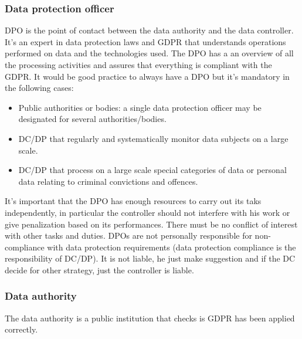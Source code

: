 \subsubsection{Data protection officer}
DPO is the point of contact between the data authority and the data controller. It's an expert in data protection laws and GDPR that understands operations performed on data and the technologies used. The DPO has a an overview of all the processing activities and assures that everything is compliant with the GDPR. It would be good practice to always have a DPO but it's mandatory in the following cases:
\begin{itemize}
    \item Public authorities or bodies: a single data protection officer may be designated for several authorities/bodies.
    \item  DC/DP that regularly and systematically monitor data subjects on a large scale.
    \item  DC/DP that process on a large scale special categories of data or personal data relating to criminal convictions and offences.
\end{itemize}
It's important that the DPO has enough resources to carry out its taks independently, in particular the controller should not interfere with his work or give penalization based on its performances. There must be no conflict of interest with other tasks and duties.
DPOs are not personally responsible for non-compliance with data protection requirements (data protection compliance is the responsibility of DC/DP). It is not liable, he just make suggestion and if the DC decide for other strategy, just the controller is liable.
\subsubsection{Data authority}
The data authority is a public institution that checks is GDPR has been applied correctly.
